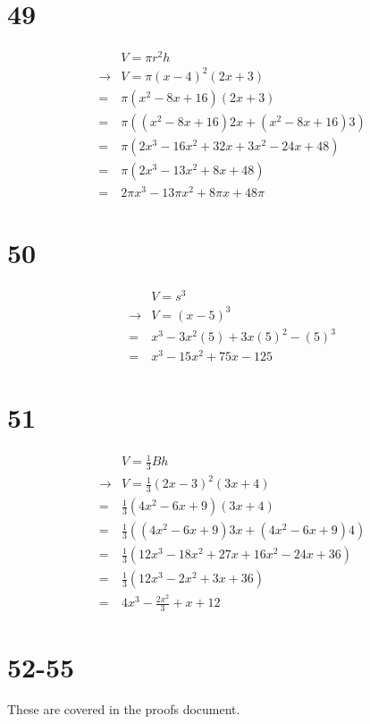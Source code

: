 \documentclass{article}
\theoremstyle{definition}
\begin{document}
\section*{49}
\[
\begin{array}{rl}
	& V=\pi r^2h \\
\rightarrow & V=\pi(x-4)^2(2x+3) \\
=	& \pi(x^2-8x+16)(2x+3) \\
=	& \pi((x^2-8x+16)2x+(x^2-8x+16)3) \\
=	& \pi(2x^3-16x^2+32x+3x^2-24x+48) \\
=	& \pi(2x^3-13x^2+8x+48) \\
=	& 2\pi x^3-13\pi x^2+8\pi x+48\pi
\end{array}
\]

\section*{50}
\[
\begin{array}{rl}
	& V=s^3 \\
\rightarrow & V=(x-5)^3 \\
=	& x^3-3x^2(5)+3x(5)^2-(5)^3 \\
=	& x^3-15x^2+75x-125
\end{array}
\]

\section*{51}
\[
\begin{array}{rl}
	& V=\frac{1}{3}Bh \\
\rightarrow & V=\frac{1}{3}(2x-3)^2(3x+4) \\
=	& \frac{1}{3}(4x^2-6x+9)(3x+4) \\
=	& \frac{1}{3}((4x^2-6x+9)3x+(4x^2-6x+9)4) \\
=	& \frac{1}{3}(12x^3-18x^2+27x+16x^2-24x+36) \\
=	& \frac{1}{3}(12x^3-2x^2+3x+36) \\
=	& 4x^3-\frac{2x^2}{3}+x+12
\end{array}
\]

\section*{52-55}
These are covered in the proofs document.
\end{document}
